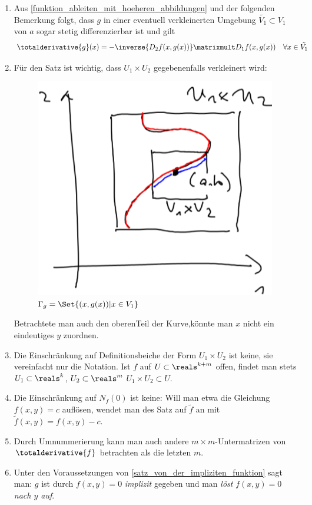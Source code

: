 \begin{bemerkungen*}
  \begin{enumerate}
    \item \label{implizite_funktion_auf_umgebung_stetig_differenzierbar} Aus \ref{funktion_ableiten_mit_hoeheren_abbildungen} und der folgenden Bemerkung folgt, dass \( g \) in einer eventuell verkleinerten Umgebung \( \tilde{V_1}\subset V_1 \) von \( a \) sogar stetig differenzierbar ist und gilt
    \begin{equation*}
      \totalderivative{g}(x)=-\inverse{D_2 f(x,g(x))}\matrixmult D_1f(x,g(x))\quad \forall x\in \tilde{V_1}
    \end{equation*}
    \item Für den Satz ist wichtig, dass \( U_1\times U_2 \) gegebenenfalls verkleinert wird:
    \begin{figure}[H]
      \centering
      \includegraphics[width=0.5\linewidth]{figures/verkleinerter_definitionsbereich_implizite_funktion}
      \caption*{\textcolor{Blue}{\( \Gamma_g=\Set{(x,g(x))|x\in V_1} \)}}
      \label{fig:verkleinerter_definitionsbereich_implizite_funktion}
    \end{figure}
    Betrachtete man auch den oberenTeil der Kurve,könnte man \( x \) nicht ein eindeutiges \( y \) zuordnen.
    \item Die Einschränkung auf Definitionsbeiche der Form \( U_1\times U_2  \) ist keine, sie vereinfacht nur die Notation. Ist \( f \) auf \( U\subset \reals^{k+m} \) offen, findet man stets \( U_1\subset \reals^k \), \( U_2\subset \reals^m \) \sd \( U_1\times U_2\subset U \).
    \item Die Einschränkung auf \( N_f(0) \) ist keine: Will man etwa die Gleichung \( f(x,y)=c \) auflösen, wendet man des Satz auf \( \tilde{f} \) an mit \( \tilde{f}(x,y)=f(x,y)-c \).
    \item Durch Umnummerierung kann man auch andere \( m\times m \)-Untermatrizen von \( \totalderivative{f} \) betrachten als die letzten \( m \).
    \item Unter den Voraussetzungen von \ref{satz_von_der_impliziten_funktion} sagt man: \( g \) ist durch \( f(x,y)=0 \) \emph{implizit} gegeben und man \emph{löst} \( f(x,y)=0 \) \emph{nach \( y \) auf}.
  \end{enumerate}
\end{bemerkungen*}
